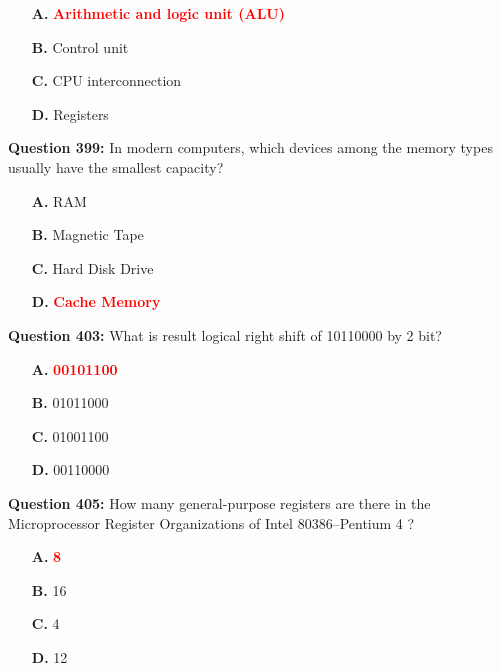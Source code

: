 \documentclass[12pt,a4paper]{article}
\begin{document}
\begin{itemize}
    \item[\textbf{A.}] \textcolor{red}{\textbf{Arithmetic and logic unit (ALU)}}
    \item[\textbf{B.}] Control unit
    \item[\textbf{C.}] CPU interconnection
    \item[\textbf{D.}] Registers
\end{itemize}

\vspace{0.5cm}

\textbf{Question 399:} In modern computers, which devices among the memory types usually have the smallest capacity?

\begin{itemize}
    \item[\textbf{A.}] RAM
    \item[\textbf{B.}] Magnetic Tape
    \item[\textbf{C.}] Hard Disk Drive
    \item[\textbf{D.}] \textcolor{red}{\textbf{Cache Memory}}
\end{itemize}

\vspace{0.5cm}

\textbf{Question 403:} What is result logical right shift of 10110000 by 2 bit?

\begin{itemize}
    \item[\textbf{A.}] \textcolor{red}{\textbf{00101100}}
    \item[\textbf{B.}] 01011000
    \item[\textbf{C.}] 01001100
    \item[\textbf{D.}] 00110000
\end{itemize}

\vspace{0.5cm}

\textbf{Question 405:} How many general-purpose registers are there in the Microprocessor Register Organizations of Intel 80386–Pentium 4 ?

\begin{itemize}
    \item[\textbf{A.}] \textcolor{red}{\textbf{8}}
    \item[\textbf{B.}] 16
    \item[\textbf{C.}] 4
    \item[\textbf{D.}] 12
\end{itemize}
\end{document}
